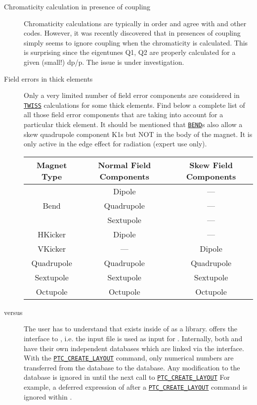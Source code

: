\begin{description}
\item[Chromaticity calculation in presence of coupling] 
  Chromaticity calculations are typically in order and agree with \ptc
  and other codes. However, it was recently discovered that in
  presences of coupling \madx simply seems to ignore coupling when the
  chromaticity is calculated. This is surprising since the eigentunes
  Q1, Q2 are properly calculated for a given (small!) dp/p. The issue
  is under investigation.  


\item[Field errors in thick elements]
  Only a very limited number of field error components are
  considered in \hyperref[chap:twiss]{\texttt{TWISS}} calculations for
  some thick elements. Find below a complete list of all those field
  error components that are taking into account for a particular thick
  element. It should be mentioned that
  \hyperref[sec:bend]{\texttt{BEND}}s also allow a skew quadrupole
  component K1s but NOT in the body of the magnet. It is only active in
  the edge effect for radiation (expert use only).  


{\renewcommand{\arraystretch}{2}
  \begin{tabular}{c | c | c}
    \hline 
    \textbf{Magnet Type} & \textbf{Normal Field Components} & \textbf{Skew Field Components} \\ 
    \hline
    & Dipole & ---\\
    Bend & Quadrupole & ---\\
    & Sextupole & ---\\
    \hline
    HKicker & Dipole & ---\\
    \hline
    VKicker & --- & Dipole\\
    \hline
    Quadrupole & Quadrupole & Quadrupole \\
    \hline
    Sextupole & Sextupole & Sextupole \\
    \hline
    Octupole & Octupole & Octupole \\
    \hline
  \end{tabular}
}

\item[\madx versus \ptc] 
  The user has to understand that \ptc exists inside of \madx as a
  library. \madx offers the interface to \ptc, i.e. the \madx input
  file is used as input for \ptc. Internally, both \ptc and \madx have
  their own independent databases which are linked via the
  interface. With the
  \hyperref[sec:ptc-create-layout]{\texttt{PTC\_CREATE\_LAYOUT}}
  command, only numerical numbers are transferred from the \madx
  database to the \ptc database. Any modification to the \madx
  database is ignored in \ptc until the next call to
  \hyperref[sec:ptc-create-layout]{\texttt{PTC\_CREATE\_LAYOUT}}
  For example, a deferred expression of \madx after a
  \hyperref[sec:ptc-create-layout]{\texttt{PTC\_CREATE\_LAYOUT}}
  command is ignored within \ptc.  
  

\end{description}

